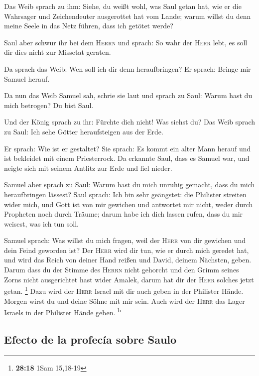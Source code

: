  Das Weib sprach zu ihm: Siehe, du weißt wohl, was Saul
getan hat, wie er die Wahrsager und Zeichendeuter ausgerottet hat vom
Lande; warum willst du denn meine Seele in das Netz führen, dass ich
getötet werde?

 Saul aber schwur ihr bei dem \textsc{Herrn} und sprach:
So wahr der \textsc{Herr} lebt, es soll dir dies nicht zur Missetat
geraten.

 Da sprach das Weib: Wen soll ich dir denn heraufbringen?
Er sprach: Bringe mir Samuel herauf.

 Da nun das Weib Samuel sah, schrie sie laut und sprach
zu Saul: Warum hast du mich betrogen? Du bist Saul.

 Und der König sprach zu ihr: Fürchte dich nicht! Was
siehst du? Das Weib sprach zu Saul: Ich sehe Götter heraufsteigen aus
der Erde.

 Er sprach: Wie ist er gestaltet? Sie sprach: Es kommt
ein alter Mann herauf und ist bekleidet mit einem Priesterrock. Da
erkannte Saul, dass es Samuel war, und neigte sich mit seinem Antlitz
zur Erde und fiel nieder.

 Samuel aber sprach zu Saul: Warum hast du mich unruhig
gemacht, dass du mich heraufbringen lässest? Saul sprach: Ich bin sehr
geängstet: die Philister streiten wider mich, und Gott ist von mir
gewichen und antwortet mir nicht, weder durch Propheten noch durch
Träume; darum habe ich dich lassen rufen, dass du mir weisest, was ich
tun soll.

 Samuel sprach: Was willst du mich fragen, weil der
\textsc{Herr} von dir gewichen und dein Feind geworden ist?
 Der \textsc{Herr} wird dir tun, wie er durch mich
geredet hat, und wird das Reich von deiner Hand reißen und David, deinem
Nächsten, geben.  Darum dass du der Stimme des
\textsc{Herrn} nicht gehorcht und den Grimm seines Zorns nicht
ausgerichtet hast wider Amalek, darum hat dir der \textsc{Herr} solches
jetzt getan. \footnote{\textbf{28:18} 1Sam 15,18-19} 
Dazu wird der \textsc{Herr} Israel mit dir auch geben in der Philister
Hände. Morgen wirst du und deine Söhne mit mir sein. Auch wird der
\textsc{Herr} das Lager Israels in der Philister Hände geben.
\textsuperscript{b}

\hypertarget{efecto-de-la-profecuxeda-sobre-saulo}{%
\subsection{Efecto de la profecía sobre
Saulo}\label{efecto-de-la-profecuxeda-sobre-saulo}}


